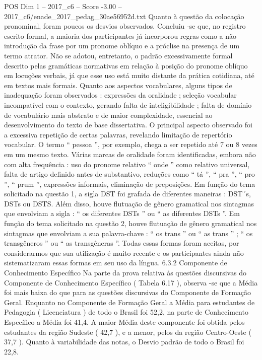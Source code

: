 \begin{textsample}{POS Dim 1 – 2017\_c6 – Score -3.00 – 2017\_c6/enade\_2017\_pedag\_30ae56952d.txt}
Quanto à questão da colocação pronominal, foram poucos os desvios observados.
Concluiu -se que, no registro escrito formal, a maioria dos participantes já incorporou regras como a não introdução da frase por um pronome oblíquo e a próclise na presença de um termo atrator.
Não se adotou, entretanto, o padrão excessivamente formal descrito pelas gramáticas normativas em relação à posição do pronome oblíquo em locuções verbais, já que esse uso está muito distante da prática cotidiana, até em textos mais formais.
Quanto aos aspectos vocabulares, alguns tipos de inadequação foram observados : expressões da oralidade ; seleção vocabular incompatível com o contexto, gerando falta de inteligibilidade ; falta de domínio de vocabulário mais abstrato e de maior complexidade, essencial ao desenvolvimento do texto de base dissertativa.
O principal aspecto observado foi a excessiva repetição de certas palavras, revelando limitação de repertório vocabular.
O termo “ pessoa ”, por exemplo, chega a ser repetido até 7 ou 8 vezes em um mesmo texto.
Várias marcas de oralidade foram identificadas, embora não com alta frequência : uso do pronome relativo “ onde ” como relativo universal, falta de artigo definido antes de substantivo, reduções como “ tá ”, “ pra ”, “ pro ”, “ prum ”, expressões informais, eliminação de preposições.
Em função do tema solicitado na questão 1, a sigla DST foi grafada de diferentes maneiras : DST´s, DSTs ou DSTS.
Além disso, houve flutuação de gênero gramatical nos sintagmas que envolviam a sigla : “ os diferentes DSTs ” ou “ as diferentes DSTs ”.
Em função do tema solicitado na questão 2, houve flutuação de gênero gramatical nos sintagmas que envolviam a sua palavra-chave : “ os trans ” ou “ as trans ” ; “ os transgêneros ” ou “ as transgêneras ”.
Todas essas formas foram aceitas, por considerarmos que sua utilização é muito recente e os participantes ainda não sistematizaram essas formas em seu uso da língua. 6.3.2 Componente de Conhecimento Específico Na parte da prova relativa às questões discursivas do Componente de Conhecimento Específico ( Tabela 6.17 ), observa -se que a Média foi mais baixa do que para as questões discursivas do Componente de Formação Geral.
Enquanto no Componente de Formação Geral a Média para estudantes de Pedagogia ( Licenciatura ) de todo o Brasil foi 52,2, na parte de Conhecimento Específico a Média foi 41,4.
A maior Média deste componente foi obtida pelos estudantes da região Sudeste ( 42,7 ), e a menor, pelos da região Centro-Oeste ( 37,7 ).
Quanto à variabilidade das notas, o Desvio padrão de todo o Brasil foi 22,8.

\end{textsample}

